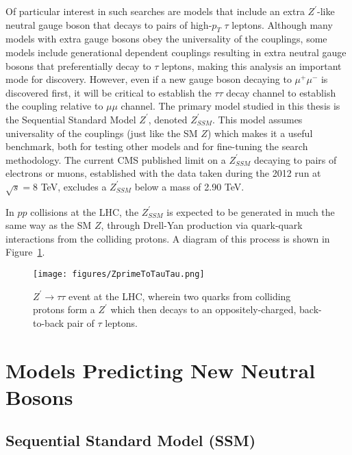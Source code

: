 Of particular interest in such searches are models that include an extra $Z^\prime$-like neutral gauge boson that decays to pairs of high-$p_{T}$ $\tau$ leptons. Although many models with extra gauge bosons obey the universality of the couplings, some models include generational dependent couplings resulting in extra neutral gauge bosons that preferentially decay to $\tau$ leptons, making this analysis an important mode for discovery. However, even if a new gauge boson decaying to $\mu^+\mu^-$ is discovered first, it will be critical to establish the $\tau\tau$ decay channel to establish the coupling relative to $\mu\mu$ channel. The primary model studied in this thesis is the Sequential Standard Model $Z^\prime$, denoted $Z^{\prime}_{SSM}$. This model assumes universality of the couplings (just like the SM $Z$) which makes it a useful benchmark, both for testing other models and for fine-tuning the search methodology. The current CMS published limit on a $Z^{\prime}_{SSM}$ decaying to pairs of electrons or muons, established with the data taken during the 2012 run at $\sqrt{s} = 8$ TeV, excludes a $Z^{\prime}_{SSM}$ below a mass of 2.90 TeV.\cite{ZprimeToEE}

In $pp$ collisions at the LHC, the $Z^\prime_{SSM}$ is expected to be generated in much the same way as the SM $Z$, through Drell-Yan production via quark-quark interactions from the colliding protons. A diagram of this process is shown in Figure~\ref{fig:ZprimeToTauTau}.

\begin{figure}
\centering
  \texttt{[image: figures/ZprimeToTauTau.png]}
  \caption{\label{fig:ZprimeToTauTau} $Z^\prime \to \tau\tau$ event at the LHC, wherein two quarks from colliding protons form a $Z^\prime$ which then decays to an oppositely-charged, back-to-back pair of $\tau$ leptons.}
\end{figure}

\section{Models Predicting New Neutral Bosons}

\subsection{Sequential Standard Model (SSM)}

